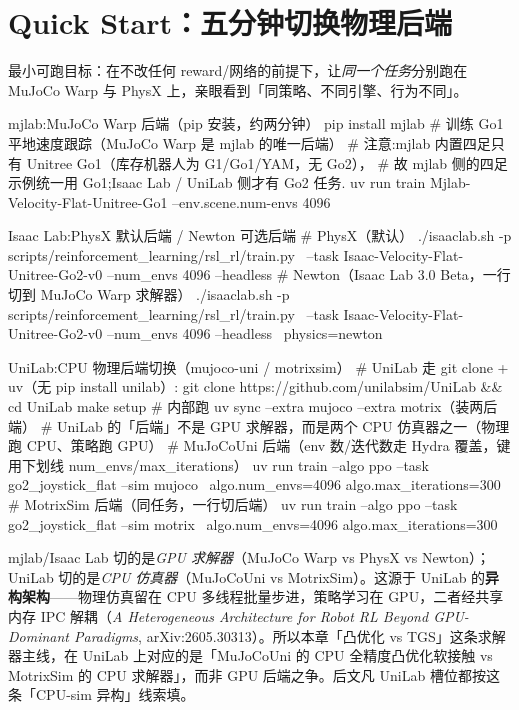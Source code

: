 \section*{Quick Start：五分钟切换物理后端}
\label{sec:rlmc-phys-quickstart}

最小可跑目标：在不改任何 reward/网络的前提下，让\emph{同一个任务}分别跑在 MuJoCo Warp 与 PhysX 上，亲眼看到「同策略、不同引擎、行为不同」。

\begin{codebox}[bash]{mjlab:MuJoCo Warp 后端（pip 安装，约两分钟）}
pip install mjlab
# 训练 Go1 平地速度跟踪（MuJoCo Warp 是 mjlab 的唯一后端）
# 注意:mjlab 内置四足只有 Unitree Go1（库存机器人为 G1/Go1/YAM，无 Go2），
#       故 mjlab 侧的四足示例统一用 Go1;Isaac Lab / UniLab 侧才有 Go2 任务.
uv run train Mjlab-Velocity-Flat-Unitree-Go1 --env.scene.num-envs 4096
\end{codebox}

\begin{codebox}[bash]{Isaac Lab:PhysX 默认后端 / Newton 可选后端}
# PhysX（默认）
./isaaclab.sh -p scripts/reinforcement_learning/rsl_rl/train.py \
    --task Isaac-Velocity-Flat-Unitree-Go2-v0 --num_envs 4096 --headless
# Newton（Isaac Lab 3.0 Beta，一行切到 MuJoCo Warp 求解器）
./isaaclab.sh -p scripts/reinforcement_learning/rsl_rl/train.py \
    --task Isaac-Velocity-Flat-Unitree-Go2-v0 --num_envs 4096 --headless \
    physics=newton
\end{codebox}

\begin{codebox}[bash]{UniLab:CPU 物理后端切换（mujoco-uni / motrixsim）}
# UniLab 走 git clone + uv（无 pip install unilab）:
git clone https://github.com/unilabsim/UniLab && cd UniLab
make setup              # 内部跑 uv sync --extra mujoco --extra motrix（装两后端）
# UniLab 的「后端」不是 GPU 求解器，而是两个 CPU 仿真器之一（物理跑 CPU、策略跑 GPU）
# MuJoCoUni 后端（env 数/迭代数走 Hydra 覆盖，键用下划线 num_envs/max_iterations）
uv run train --algo ppo --task go2_joystick_flat --sim mujoco \
    algo.num_envs=4096 algo.max_iterations=300
# MotrixSim 后端（同任务，一行切后端）
uv run train --algo ppo --task go2_joystick_flat --sim motrix \
    algo.num_envs=4096 algo.max_iterations=300
\end{codebox}

\begin{note}[UniLab 的「后端」与 mjlab/Isaac Lab 不在同一维度]
mjlab/Isaac Lab 切的是\emph{GPU 求解器}（MuJoCo Warp vs PhysX vs Newton）；UniLab 切的是\emph{CPU 仿真器}（MuJoCoUni vs MotrixSim）。这源于 UniLab 的\textbf{异构架构}——物理仿真留在 CPU 多线程批量步进，策略学习在 GPU，二者经共享内存 IPC 解耦（\emph{A Heterogeneous Architecture for Robot RL Beyond GPU-Dominant Paradigms}, arXiv:2605.30313）\cite{unilab2026}。所以本章「凸优化 vs TGS」这条求解器主线，在 UniLab 上对应的是「MuJoCoUni 的 CPU 全精度凸优化软接触 vs MotrixSim 的 CPU 求解器」，而非 GPU 后端之争。后文凡 UniLab 槽位都按这条「CPU-sim 异构」线索填。
\end{note}

